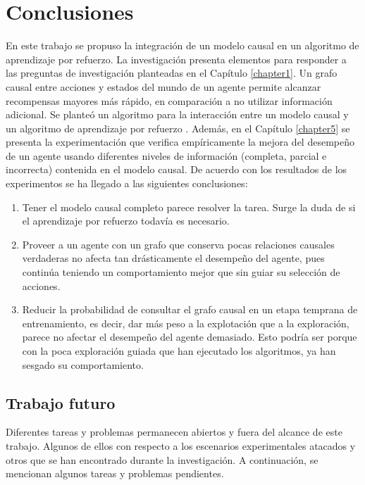 \chapter{Conclusiones}\label{chapter6}

\graphicspath{{Chapter5/Figs/}}

En este trabajo se propuso la integración de un modelo causal en un
algoritmo de aprendizaje por refuerzo.
La investigación presenta
elementos para responder a las preguntas de investigación planteadas en el Capítulo \ref{chapter1}. Un grafo causal entre acciones y estados del mundo de
un agente permite alcanzar recompensas mayores más rápido, en comparación a no utilizar información adicional.
Se planteó un algoritmo para la interacción entre un modelo causal
    y un algoritmo de aprendizaje por refuerzo .
    Además, en el Capítulo \ref{chapter5} se presenta la experimentación que verifica empíricamente
    la mejora del desempeño de un agente usando diferentes niveles de información (completa, parcial e incorrecta) contenida en el modelo causal. De acuerdo con los resultados de los experimentos 
    se ha llegado a las siguientes conclusiones:
    
\begin{enumerate}
    \item Tener el modelo causal completo parece resolver la tarea. Surge la 
    duda de si el aprendizaje por refuerzo todavía es necesario.
    \item Proveer a un agente con un grafo que conserva pocas relaciones
    causales verdaderas no afecta tan drásticamente el desempeño del agente, pues 
    continúa teniendo un comportamiento mejor que sin guiar su selección de acciones.
    \item Reducir la probabilidad de consultar el grafo causal en un etapa 
    temprana de entrenamiento, es decir, dar más peso a la explotación que a la exploración, parece no afectar el desempeño del agente demasiado. Esto podría
    ser porque con la poca exploración guiada que han ejecutado los algoritmos,
    ya han sesgado su comportamiento.
\end{enumerate}

\section{Trabajo futuro}

Diferentes tareas y problemas permanecen abiertos y fuera del alcance de este trabajo. Algunos de ellos con respecto a los escenarios experimentales atacados  y otros que se han encontrado durante la investigación. A continuación, se 
mencionan algunos tareas y problemas pendientes.


